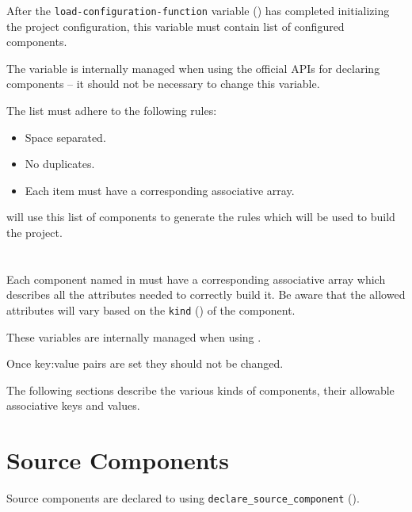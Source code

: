 After the \texttt{load-configuration-function} variable
() has completed
initializing the project configuration, this variable must contain list
of configured components.

The variable is internally managed when using the official APIs for
declaring components -- it should not be necessary to change this
variable.

The list must adhere to the following rules:

\begin{itemize}
\item Space separated.
\item No duplicates.
\item Each item must have a corresponding 
  associative array.
\end{itemize}

\lmsbw will use this list of components to generate the rules which
will be used to build the project.

\section{}\label{variables:lmsbw-component-component}

Each component named in \lmsbwcomponents must have a corresponding
associative array which describes all the attributes needed to
correctly build it.  Be aware that the allowed attributes will vary
based on the \texttt{kind} () of the component.

These variables are internally managed when using \lmsbw.

Once key:value pairs are set they should not be changed.

The following sections describe the various kinds of components, their
allowable associative keys and values.

\section{Source Components}

Source components are declared to \lmsbw using
\texttt{declare\_source\_component}
().

